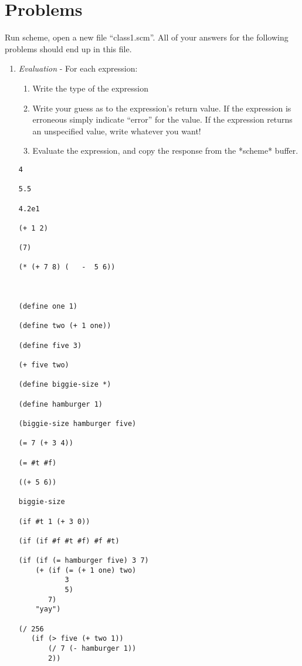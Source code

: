 \section*{Problems}
Run scheme, open a new file ``class1.scm''.  All of your answers for
the following problems should end up in this file.

\begin{enumerate}
\item {\large {\it Evaluation}} - For each expression:
\begin{enumerate}
\item Write the type of the expression
\item Write your guess as to the expression's return value.
If the expression is erroneous simply indicate ``error'' for the value.  
If the expression returns an unspecified value, write whatever you want!
\item Evaluate the expression, and copy the response from the *scheme* buffer.
\end{enumerate}

\begin{verbatim}
4

5.5

4.2e1

(+ 1 2)

(7)

(* (+ 7 8) (   -  5 6))



(define one 1)

(define two (+ 1 one))

(define five 3)

(+ five two)

(define biggie-size *)

(define hamburger 1)

(biggie-size hamburger five)

(= 7 (+ 3 4))

(= #t #f)

((+ 5 6))

biggie-size

(if #t 1 (+ 3 0))

(if (if #f #t #f) #f #t)

(if (if (= hamburger five) 3 7) 
    (+ (if (= (+ 1 one) two)
           3
           5)
       7)
    "yay")

(/ 256
   (if (> five (+ two 1))
       (/ 7 (- hamburger 1))
       2))
\end{verbatim}


\end{enumerate}
